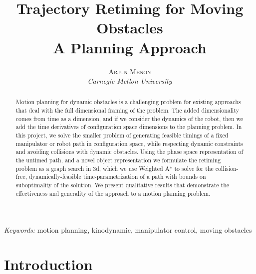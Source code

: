 \documentclass[letterpaper,12pt]{article} %
\title{\textbf{Trajectory Retiming for Moving Obstacles}\\ %
A Planning Approach} %
\author{\textsc{Arjun Menon} %
\\{\textit{Carnegie Mellon University}}} %
\makeatletter
\renewcommand{\maketitle}{ %
\begin{flushright} %
{\LARGE\@title} %

\vspace{5pt} %

{\large\@author} %
\vspace{0pt} %
\end{flushright}
}
\makeatother
\begin{document}
\maketitle %


\renewcommand{\abstractname}{Summary} %

\begin{abstract}
Motion planning for dynamic obstacles is a challenging problem for existing approachs that deal with the
full dimensional framing of the problem. The added dimensionality comes from time as a dimension, and if
we consider the dynamics of the robot, then we add the time derivatives of configuration space dimensions
to the planning problem. In this project, we solve the smaller problem of generating feasible timings of a
fixed manipulator or robot path in configuration space, while respecting dynamic constraints and avoiding
collisions with dynamic obstacles. Using the phase space representation of the untimed path, and a novel
object representation we formulate the retiming problem as a graph search in 3d, which we use Weighted A*
to solve for the collision-free, dynamically-feasible time-parametrization of a path with bounds on 
suboptimality of the solution. We present qualitative results that demonstrate the effectiveness and 
generality of the approach to a motion planning problem.
\end{abstract}

\hspace*{3,6mm}\textit{Keywords:} motion planning, kinodynamic, manipulator control, moving obstacles %

\vspace{10pt} %


\section{Introduction}
\end{document}
